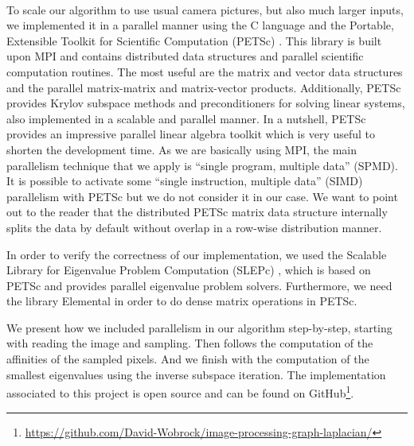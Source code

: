 \paragraph{}
To scale our algorithm to use usual camera pictures, but also much larger inputs, we implemented it in a parallel manner using the C language and the Portable, Extensible Toolkit for Scientific Computation (PETSc) \cite{petsc_web_page}.
This library is built upon MPI and contains distributed data structures and parallel scientific computation routines.
\ifthesis
 The most useful are the matrix and vector data structures and the parallel matrix-matrix and matrix-vector products.
 Additionally, PETSc provides Krylov subspace methods and preconditioners for solving linear systems, also implemented in a scalable and parallel manner.
\fi
In a nutshell, PETSc provides an impressive parallel linear algebra toolkit which is very useful to shorten the development time.
\ifthesis
 As we are basically using MPI, the main parallelism technique that we apply is ``single program, multiple data'' (SPMD).
 It is possible to activate some ``single instruction, multiple data'' (SIMD) parallelism with PETSc but we do not consider it in our case.
 We want to point out to the reader that the distributed PETSc matrix data structure internally splits the data by default without overlap in a row-wise distribution manner.
\fi

In order to verify the correctness of our implementation, we used the Scalable Library for Eigenvalue Problem Computation (SLEPc) \cite{hernandez_slepc_2005}, which is based on PETSc and provides parallel eigenvalue problem solvers.
Furthermore, we need the library Elemental \cite{poulson_elemental_2013} in order to do dense matrix operations in PETSc.

\ifthesis
 We present how we included parallelism in our algorithm step-by-step, starting with reading the image and sampling.
 Then follows the computation of the affinities of the sampled pixels.
 And we finish with the computation of the smallest eigenvalues using the inverse subspace iteration.
\fi
The implementation associated to this project is open source and can be found on GitHub\footnote{\url{https://github.com/David-Wobrock/image-processing-graph-laplacian/}}.
